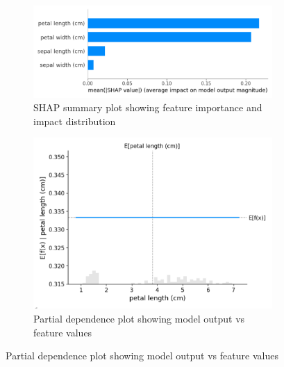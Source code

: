 \begin{figure}[htbp]
    \begin{subfigure}[c]{0.385\textwidth}
        \centering
        \includegraphics[width=\textwidth]{images/shapSummaryPlot.png}
        \caption{SHAP summary plot showing feature importance and impact distribution}
        \label{fig:shap_summary}
    \end{subfigure}
    \hfill
    \begin{subfigure}[c]{0.385\textwidth}
        \centering
        \includegraphics[width=\textwidth]{images/shapPartialDependencePlot.png}
        \caption{Partial dependence plot showing model output vs feature values}
        \label{fig:shap_dependence}
    \end{subfigure}
    
    \vspace{0.5cm}
    

\end{figure}
